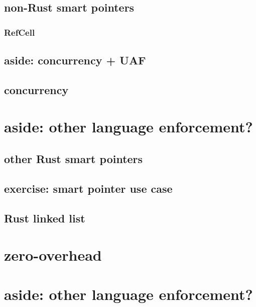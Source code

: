 \subsection{non-Rust smart pointers}


\subsubsection{RefCell}


\subsection{aside: concurrency + UAF}


\subsection{concurrency}


\section{aside: other language enforcement?}



\subsection{other Rust smart pointers}


\subsection{exercise: smart pointer use case}


\subsection{Rust linked list}


\section{zero-overhead}


\section{aside: other language enforcement?}


